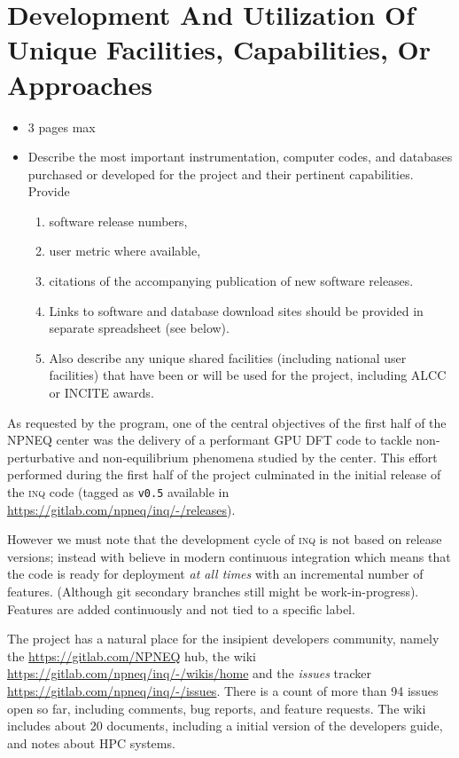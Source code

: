 \section{Development And Utilization Of Unique Facilities, Capabilities, Or Approaches}
\label{sec:development}
{\small\color{red}
\begin{itemize}
\item 3 pages max
    \item Describe the most important instrumentation, computer codes, and databases purchased or developed for the project and their pertinent capabilities. Provide 
    \begin{enumerate}
        \item software release numbers,
        \item user metric where available,
        
        \item citations of the accompanying publication of new software releases.
        \item Links to software and database download sites should be provided in separate spreadsheet (see below).
        \item Also describe any unique shared facilities (including national user facilities) that have been or will be used for the project, including ALCC or INCITE awards.
    \end{enumerate}    
\end{itemize}

}

As requested by the program, one of the central objectives of the first half of the NPNEQ center was the delivery of a performant GPU DFT code to tackle non-perturbative and non-equilibrium phenomena studied by the center.
This effort performed during the first half of the project culminated in the initial release of the \textsc{inq} code (tagged as \texttt{v0.5} available in \url{https://gitlab.com/npneq/inq/-/releases}).

However we must note that the development cycle of \textsc{inq} is not based on release versions; instead with believe in modern continuous integration which means that the code is ready for deployment \emph{at all times} with an incremental number of features.
(Although git secondary branches still might be work-in-progress).
Features are added continuously and not tied to a specific label.

The project has a natural place for the insipient developers community, namely the \url{https://gitlab.com/NPNEQ} hub, the wiki \url{https://gitlab.com/npneq/inq/-/wikis/home} and the \emph{issues} tracker \url{https://gitlab.com/npneq/inq/-/issues}.
There is a count of more than 94 issues open so far, including comments, bug reports, and feature requests.
The wiki includes about 20 documents, including a initial version of the developers guide, and notes about HPC systems.

